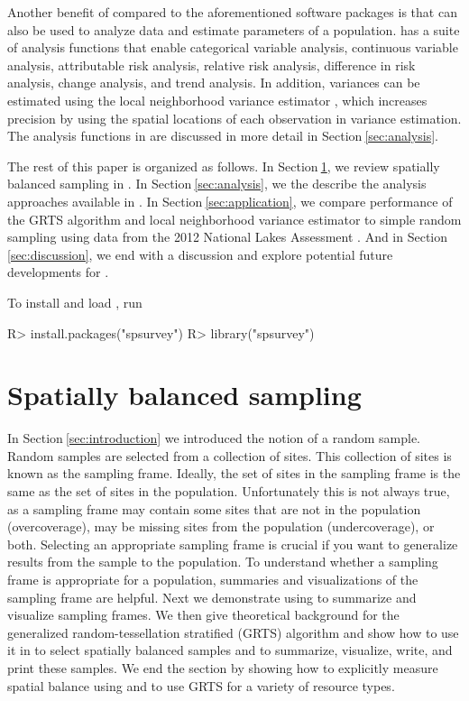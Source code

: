 \documentclass[
  shortnames]{jss}
\begin{document}
Another benefit of  compared to the aforementioned
software packages is that  can also be used to analyze
data and estimate parameters of a population.  has a suite
of analysis functions that enable categorical variable analysis,
continuous variable analysis, attributable risk analysis, relative risk
analysis, difference in risk analysis, change analysis, and trend
analysis. In addition, variances can be estimated using the local
neighborhood variance estimator \citep{stevens2003variance}, which
increases precision by using the spatial locations of each observation
in variance estimation. The analysis functions in  are
discussed in more detail in Section\(~\)\ref{sec:analysis}.

The rest of this paper is organized as follows. In
Section\(~\)\ref{sec:design}, we review spatially balanced sampling in
. In Section\(~\)\ref{sec:analysis}, we the describe the
analysis approaches available in . In
Section\(~\)\ref{sec:application}, we compare performance of the GRTS
algorithm and local neighborhood variance estimator to simple random
sampling using data from the 2012 National Lakes Assessment
\citep{usepa2012NLA}. And in Section\(~\)\ref{sec:discussion}, we end
with a discussion and explore potential future developments for
.

To install and load , run

\begin{CodeChunk}
\begin{CodeInput}
R> install.packages("spsurvey")
R> library("spsurvey")
\end{CodeInput}
\end{CodeChunk}

\hypertarget{sec:design}{%
\section{Spatially balanced sampling}\label{sec:design}}

In Section\(~\)\ref{sec:introduction} we introduced the notion of a
random sample. Random samples are selected from a collection of sites.
This collection of sites is known as the sampling frame. Ideally, the
set of sites in the sampling frame is the same as the set of sites in
the population. Unfortunately this is not always true, as a sampling
frame may contain some sites that are not in the population
(overcoverage), may be missing sites from the population
(undercoverage), or both. Selecting an appropriate sampling frame is
crucial if you want to generalize results from the sample to the
population. To understand whether a sampling frame is appropriate for a
population, summaries and visualizations of the sampling frame are
helpful. Next we demonstrate using  to summarize and
visualize sampling frames. We then give theoretical background for the
generalized random-tessellation stratified (GRTS) algorithm and show how
to use it in  to select spatially balanced samples and to
summarize, visualize, write, and print these samples. We end the section
by showing how to explicitly measure spatial balance using
 and to use GRTS for a variety of resource types.
\end{document}
